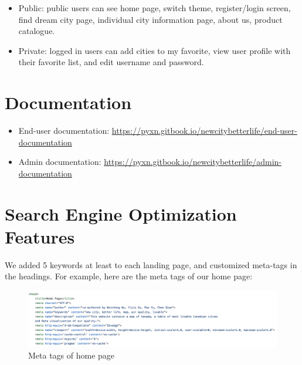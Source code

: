 \documentclass[12pt, letterpaper]{article}
\begin{document}
\begin{itemize}
\item Public: public users can see home page, switch theme, register/login screen, find dream city page, individual city information page, about us, product catalogue.
\item Private: logged in users can add cities to my favorite, view user profile with their favorite list, and edit username and password.
\end{itemize}

\section{Documentation}

\begin{itemize}
	\item End-user documentation:	\url{https://pyxn.gitbook.io/newcitybetterlife/end-user-documentation}
	\item Admin documentation: 		\url{https://pyxn.gitbook.io/newcitybetterlife/admin-documentation}
\end{itemize}

\section{Search Engine Optimization Features}
We added 5 keywords at least to each landing page, and customized meta-tags in the headings.
For example, here are the meta tags of our home page:

\begin{figure}[htbp]
	\centering
	\includegraphics[width=6in]{images/q11.png}
	\caption{Meta tags of home page}
 \end{figure}

 \newpage

\end{document}
